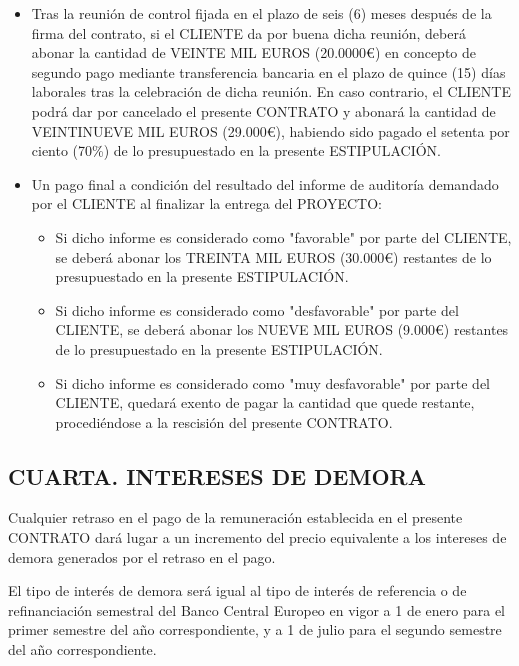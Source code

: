 \documentclass[a4paper,11pt]{report}
\begin{document}
	\begin{itemize}
	    \item Tras la reunión de control fijada en el plazo de seis (6) meses después de la
	    firma del contrato, si el CLIENTE da por buena dicha reunión, deberá abonar la
	    cantidad de VEINTE MIL EUROS (20.0000\euro) en concepto de segundo pago mediante
	    transferencia bancaria en el plazo de quince (15) días laborales tras la celebración
	    de dicha reunión. En caso contrario, el CLIENTE podrá dar por cancelado el presente
	    CONTRATO y abonará la cantidad de VEINTINUEVE MIL EUROS (29.000\euro), habiendo sido
	    pagado el setenta por ciento (70\%) de lo presupuestado en la presente ESTIPULACIÓN.
	    
	    \item Un pago final a condición del resultado del informe de auditoría demandado
	    por el CLIENTE al finalizar la entrega del PROYECTO:
	        \begin{itemize}
	            \item Si dicho informe es considerado como "favorable" por parte del CLIENTE, se deberá abonar los TREINTA MIL EUROS (30.000\euro) restantes
	            de lo presupuestado en la presente ESTIPULACIÓN.
	            \item Si dicho informe es considerado como "desfavorable" por parte del CLIENTE, se deberá abonar los NUEVE MIL EUROS (9.000\euro) restantes
	            de lo presupuestado en la presente ESTIPULACIÓN.
	            \item Si dicho informe es considerado como "muy desfavorable" por parte del CLIENTE, quedará exento de pagar la cantidad que quede restante,
	            procediéndose a la rescisión del presente CONTRATO. 
	        \end{itemize}
	\end{itemize}

	\subsection*{CUARTA. INTERESES DE DEMORA}

	Cualquier	retraso en el pago de la remuneración establecida en el presente
	CONTRATO dará lugar a un incremento del precio equivalente a los
	intereses de demora generados por el retraso en el pago.

	El tipo de interés de demora será igual al tipo de interés de referencia
	o de refinanciación semestral del Banco Central Europeo en vigor a 1 de
	enero para el primer semestre del año correspondiente, y a 1 de julio
	para el segundo semestre del año correspondiente.
\end{document}
